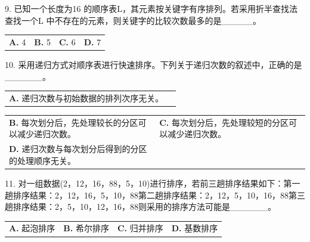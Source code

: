 \documentclass[UTF8,11pt]{ctexart}
\begin{document}
9. 已知一个长度为16 的顺序表L，其元素按关键字有序排列。若采用折半查找法查找一个L 中不存在的元素，则关键字的比较次数最多的是\_\_\_\_\_。


\begin{center}\begin{tabular}{>{\raggedright\arraybackslash}p{\dimexpr(\linewidth-8\tabcolsep)/4\relax}>{\raggedright\arraybackslash}p{\dimexpr(\linewidth-8\tabcolsep)/4\relax}>{\raggedright\arraybackslash}p{\dimexpr(\linewidth-8\tabcolsep)/4\relax}>{\raggedright\arraybackslash}p{\dimexpr(\linewidth-8\tabcolsep)/4\relax}}
\textbf{A.} 4 & \textbf{B.} 5 & \textbf{C.} 6 & \textbf{D.} 7\\[.35em]\end{tabular}\end{center}

10. 采用递归方式对顺序表进行快速排序。下列关于递归次数的叙述中，正确的是\_\_\_\_\_\_。


\begin{center}\begin{tabular}{>{\raggedright\arraybackslash}p{\dimexpr(\linewidth-4\tabcolsep)/2\relax}>{\raggedright\arraybackslash}p{\dimexpr(\linewidth-4\tabcolsep)/2\relax}}
\textbf{A.} 递归次数与初始数据的排列次序无关。 & \\[.35em]\end{tabular}\end{center}

\begin{center}\begin{tabular}{>{\raggedright\arraybackslash}p{\dimexpr(\linewidth-4\tabcolsep)/2\relax}>{\raggedright\arraybackslash}p{\dimexpr(\linewidth-4\tabcolsep)/2\relax}}
\textbf{B.} 每次划分后，先处理较长的分区可以减少递归次数。 & \textbf{C.} 每次划分后，先处理较短的分区可以减少递归次数。\\[.35em]
\textbf{D.} 递归次数与每次划分后得到的分区的处理顺序无关。 & \\[.35em]\end{tabular}\end{center}

11. 对一组数据(2，12，16，88，5，10)进行排序，若前三趟排序结果如下：第一趟排序结果：2，12，16，5，10，88第二趟排序结果：2，12，5，10，16，88第三趟排序结果：2，5，10，12，16，88则采用的排序方法可能是\_\_\_\_\_\_。


\begin{center}\begin{tabular}{>{\raggedright\arraybackslash}p{\dimexpr(\linewidth-8\tabcolsep)/4\relax}>{\raggedright\arraybackslash}p{\dimexpr(\linewidth-8\tabcolsep)/4\relax}>{\raggedright\arraybackslash}p{\dimexpr(\linewidth-8\tabcolsep)/4\relax}>{\raggedright\arraybackslash}p{\dimexpr(\linewidth-8\tabcolsep)/4\relax}}
\textbf{A.} 起泡排序 & \textbf{B.} 希尔排序 & \textbf{C.} 归并排序 & \textbf{D.} 基数排序\\[.35em]\end{tabular}\end{center}
\end{document}
